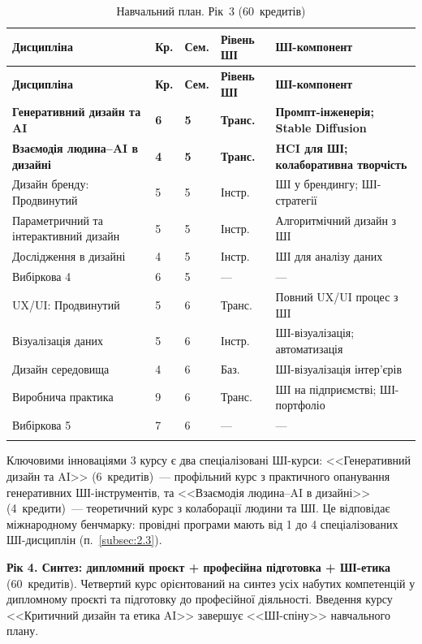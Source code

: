 \begin{longtable}{@{}p{}p{}p{}p{}p{}@{}}
\caption{Навчальний план. Рік~3 (60~кредитів)}\label{tab:year3} \\
\hline
\textbf{Дисципліна} & \textbf{Кр.} & \textbf{Сем.} & \textbf{Рівень ШІ} & \textbf{ШІ-компонент} \\
\hline
\endfirsthead
\hline
\textbf{Дисципліна} & \textbf{Кр.} & \textbf{Сем.} & \textbf{Рівень ШІ} & \textbf{ШІ-компонент} \\
\hline
\endhead
\textbf{Генеративний дизайн та AI} & \textbf{6} & \textbf{5} & \textbf{Транс.} & \textbf{Промпт-інженерія; Stable Diffusion} \\
\textbf{Взаємодія людина--AI в дизайні} & \textbf{4} & \textbf{5} & \textbf{Транс.} & \textbf{HCI для ШІ; колаборативна творчість} \\
Дизайн бренду: Продвинутий & 5 & 5 & Інстр. & ШІ у брендингу; ШІ-стратегії \\
Параметричний та інтерактивний дизайн & 5 & 5 & Інстр. & Алгоритмічний дизайн з ШІ \\
Дослідження в дизайні & 4 & 5 & Інстр. & ШІ для аналізу даних \\
Вибіркова 4 & 6 & 5 & --- & --- \\
\addlinespace
UX/UI: Продвинутий & 5 & 6 & Транс. & Повний UX/UI процес з ШІ \\
Візуалізація даних & 5 & 6 & Інстр. & ШІ-візуалізація; автоматизація \\
Дизайн середовища & 4 & 6 & Баз. & ШІ-візуалізація інтер'єрів \\
Виробнича практика & 9 & 6 & Транс. & ШІ на підприємстві; ШІ-портфоліо \\
Вибіркова 5 & 7 & 6 & --- & --- \\
\addlinespace
\multicolumn{5}{@{}l}{\textit{Підсумок: 1~--- базовий, 4~--- інструментальний, 4~--- трансформаційний}} \\
\hline
\end{longtable}

Ключовими інноваціями 3 курсу є два спеціалізовані ШІ-курси: <<Генеративний дизайн та AI>> (6~кредитів)~--- профільний курс з практичного опанування генеративних ШІ-інструментів, та <<Взаємодія людина--AI в дизайні>> (4~кредити)~--- теоретичний курс з колаборації людини та ШІ. Це відповідає міжнародному бенчмарку: провідні програми мають від 1 до 4 спеціалізованих ШІ-дисциплін (п.~\ref{subsec:2.3}).

\textbf{Рік 4. Синтез: дипломний проєкт + професійна підготовка + ШІ-етика} (60~кредитів). Четвертий курс орієнтований на синтез усіх набутих компетенцій у дипломному проєкті та підготовку до професійної діяльності. Введення курсу <<Критичний дизайн та етика AI>> завершує <<ШІ-спіну>> навчального плану.

